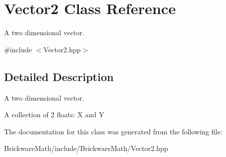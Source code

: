 \hypertarget{classVector2}{}\section{Vector2 Class Reference}
\label{classVector2}


A two dimensional vector.  




{\ttfamily \#include $<$Vector2.\+hpp$>$}



\subsection{Detailed Description}
A two dimensional vector. 

A collection of 2 floats\+: X and Y 

The documentation for this class was generated from the following file\+:\begin{DoxyCompactItemize}
\item 
Brickware\+Math/include/\+Brickware\+Math/Vector2.\+hpp\end{DoxyCompactItemize}
